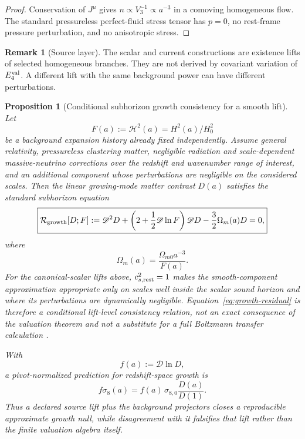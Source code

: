 \documentclass[aps,prd,reprint,onecolumn,nofootinbib,superscriptaddress,showkeys]{revtex4-2}
\numberwithin{equation}{section}
\theoremstyle{definition}
\newtheorem{remark}{Remark}[section]
\theoremstyle{plain}
\newtheorem{proposition}{Proposition}[section]
\newcommand{\Dil}{\mathscr D}
\begin{document}
\begin{proof}
Conservation of \(J^\mu\) gives \(n\propto V_3^{-1}\propto a^{-3}\) in a comoving homogeneous flow.  The standard pressureless perfect-fluid stress tensor has \(p=0\), no rest-frame pressure perturbation, and no anisotropic stress.
\end{proof}

\begin{remark}[Source layer]
The scalar and current constructions are existence lifts of selected homogeneous branches.  They are not derived by covariant variation of \(E_4^{\rm val}\).  A different lift with the same background power can have different perturbations.
\end{remark}

\begin{proposition}[Conditional subhorizon growth consistency for a smooth lift]\label{prop:growth-null}
Let
\[
F(a):=\mathcal H^2(a)=H^2(a)/H_0^2
\]
be a background expansion history already fixed independently.  Assume general relativity, pressureless clustering matter, negligible radiation and scale-dependent massive-neutrino corrections over the redshift and wavenumber range of interest, and an additional component whose perturbations are negligible on the considered scales.  Then the linear growing-mode matter contrast $D(a)$ satisfies the standard subhorizon equation
\begin{equation}
\boxed{
\mathcal R_{\rm growth}[D;F]
:=
\Dil^2D+
\left(2+\frac12\Dil\ln F\right)\Dil D
-\frac32\Omega_m(a)D
=0,
}
\label{eq:growth-residual}
\end{equation}
where
\begin{equation}
\Omega_m(a)=\frac{\Omega_{m0}a^{-3}}{F(a)}.
\end{equation}
For the canonical-scalar lifts above, $c_{s,\rm rest}^2=1$ makes the smooth-component approximation appropriate only on scales well inside the scalar sound horizon and where its perturbations are dynamically negligible.  Equation~\eqref{eq:growth-residual} is therefore a conditional lift-level consistency relation, not an exact consequence of the valuation theorem and not a substitute for a full Boltzmann transfer calculation \cite{Linder2005}.

With
\[
f(a):=\Dil\ln D,
\]
a pivot-normalized prediction for redshift-space growth is
\begin{equation}
 f\sigma_8(a)
 =f(a)\,\sigma_{8,0}\frac{D(a)}{D(1)}.
\end{equation}
Thus a declared source lift plus the background projectors closes a reproducible approximate growth null, while disagreement with it falsifies that lift rather than the finite valuation algebra itself.
\end{proposition}
\end{document}
